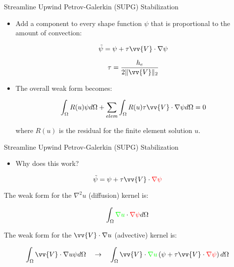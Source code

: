 \documentclass{beamer}
\begin{document}
\begin{frame}{Streamline Upwind Petrov-Galerkin (SUPG) Stabilization}

\begin{itemize}
\item Add a component to every shape function \(\psi\) that is proportional to the amount of convection:

\begin{equation}
\tilde{\psi}=\psi+\tau\vv{V}\cdot\nabla \psi
\end{equation}

\begin{equation}
\tau=\frac{h_e}{2\|\vv{V}\|_2}
\end{equation}

\item The overall weak form becomes:

\begin{equation}
\int_{\Omega}R(u)\psi d\Omega+\sum_{elem}\int_{\Omega}R(u)\tau\vv{V}\cdot\nabla \psi d\Omega=0
\end{equation}

where \(R(u)\) is the residual for the finite element solution \(u\).
\end{itemize}
\end{frame}

\begin{frame}{Streamline Upwind Petrov-Galerkin (SUPG) Stabilization}
\begin{itemize}
\item Why does this work?
\end{itemize}

\begin{equation}
\tilde{\psi}=\psi+\tau\vv{V}\cdot\color{red}\nabla \psi\color{black}
\end{equation}

The weak form for the \(\nabla^2 u\) (diffusion) kernel is:

\begin{equation}
\int_{\Omega}^{}\color{green}\nabla u\color{black}\cdot\color{red}\nabla\psi\color{black} d\Omega
\end{equation}

The weak form for the \(\vv{V}\cdot\nabla u\) (advective) kernel is:

\begin{equation}
\int_{\Omega}^{}\vv{V}\cdot\nabla u\psi d\Omega\quad\rightarrow\quad\int_{\Omega}^{}\vv{V}\cdot\color{green}\nabla u\color{black}\left(\psi+\tau\vv{V}\cdot\color{red}\nabla \psi\color{black}\right) d\Omega
\end{equation}

\end{frame}
\end{document}
